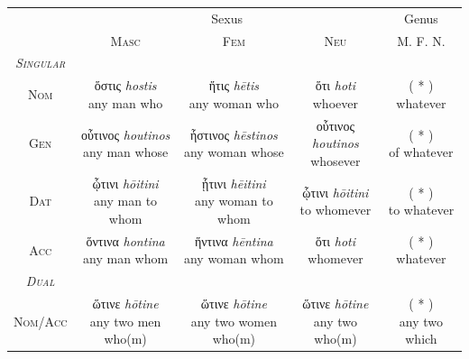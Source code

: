 \documentclass[10pt,a4paper,notitlepage]{article}
\newcommand{\tsc}[1]{\textsc{#1}}
\newcommand*{\grc}[1]{\fontspec{Inter}#1\rmfamily}
\newcommand{\trc}[1]{\textit{\fontspec{Tinos}#1}}
\begin{document}
    \begin{table}[H]
        \begin{tabular}{c|ccc|c}
            & \multicolumn{3}{c|}{Sexus} & Genus \\
            & \tsc{Masc} & \tsc{Fem} & \tsc{Neu} & \tsc{M. F. N.} \\
            \hline
            \emph{\tsc{Singular}} & & & & \\
            \tsc{Nom} & \makecell{\grc{ὅστις} \trc{hostis} \\ \small any man who} & \makecell{\grc{ἥτις} \trc{hētis} \\ \small any woman who } & \makecell{\grc{ὅτι} \trc{hoti} \\ \small whoever} & \makecell{( * ) \\ \small whatever} \\
            \tsc{Gen} & \makecell{\grc{οὗτινος} \trc{houtinos} \\ \small any man whose} & \makecell{\grc{ἧστινος} \trc{hēstinos} \\ \small any woman whose} & \makecell{\grc{οὗτινος} \trc{houtinos} \\ \small whosever } & \makecell{( * ) \\ \small of whatever} \\
            \tsc{Dat} & \makecell{\grc{ᾧτινι} \trc{hōitini} \\ \small any man to whom } & \makecell{\grc{ᾗτινι} \trc{hēitini} \\ \small any woman to whom} & \makecell{\grc{ᾧτινι} \trc{hōitini} \\ \small to whomever} & \makecell{( * ) \\ \small to whatever} \\
            \tsc{Acc} & \makecell{\grc{ὅντινα} \trc{hontina} \\ \small any man whom} & \makecell{\grc{ἥντινα} \trc{hēntina} \\ \small any woman whom} & \makecell{\grc{ὅτι} \trc{hoti} \\ \small whomever} & \makecell{( * ) \\ \small whatever} \\
            \hline
            \emph{\tsc{Dual}} & & & & \\
            \tsc{Nom/Acc} & \makecell{\grc{ὥτινε} \trc{hōtine} \\ \small any two men who(m)} & \makecell{\grc{ὥτινε} \trc{hōtine} \\ \small any two women who(m)} & \makecell{\grc{ὥτινε} \trc{hōtine} \\ \small any two who(m)} & \makecell{( * ) \\ \small any two which} \\

\end{tabular}
\end{table}
\end{document}
